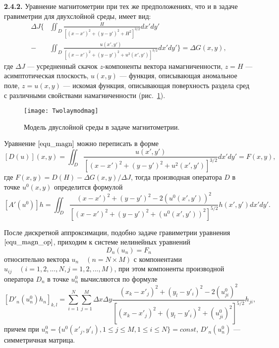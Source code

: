 {\bfseries 2.4.2.} 
Уравнение магнитометрии при тех же предположениях, что и в задаче гравиметрии для двухслойной среды, имеет вид:
\begin{equation}\label{equ_magn}\begin{aligned}
\Delta J  \bigg\{&\iint_{D} \frac{H}{[(x-x')^2+(y-y')^2+H^2]^{3/2}}dx'dy' \\
- &\iint_{D} \frac{u(x',y')}{[(x-x')^2+(y-y')^2+u^2(x',y')]^{3/2}}dx'dy' \bigg\}=\Delta G(x,y),
\end{aligned} \end{equation}
где $\Delta J$ --- усредненный скачок $z$-компоненты вектора намагниченности, $z=H$ --- асимптотическая плоскость, $u(x,y)$ --- функция, описывающая аномальное поле, $z=u(x,y)$ --- искомая функция, описывающая поверхность раздела сред с различными свойствами намагниченности (рис.~\ref{fig:twolayermag}). 
\begin{figure}[h]
	\centering
	\texttt{[image: Twolaymodmag]}
	\caption{Модель двуслойной среды в задаче магнитометрии.}
	\label{fig:twolayermag}
\end{figure}
Уравнение $\eqref{equ_magn}$ можно переписать в форме
\begin{equation}\label{equ_magn_op}
[D(u)](x,y)= \iint_{D} \frac{u(x',y')}{[(x-x')^2+(y-y')^2+u^2(x',y')]^{3/2}}dx'dy'=F(x,y),
\end{equation}
где $F(x,y)=D(H)-\Delta G(x,y)/\Delta J$, тогда производная оператора $D$ в точке $u^0(x,y)$ определится формулой
$$ [A'(u^0)]h=\iint_{D} \frac{(x-x')^2+(y-y')^2-2(u^0(x',y'))^2}{[(x-x')^2+(y-y')^2+(u^0(x',y'))^2]^{5/2}}h(x',y')dx'dy'. $$

После дискретной аппроксимации, подобно задаче гравиметрии уравнения $\eqref{equ_magn_op}$, приходим к системе нелинейных уравнений
\begin{equation}\label{equ_snle_mag}
D_n(u_n)=F_n
\end{equation}
относительно вектора $u_n \quad (n=N\times M)$ с компонентами $u_{ij}\quad (i=1,2,...,N, j=1,2,...,M)$, при этом компоненты производной оператора $D_n$ в точке $u_{n}^{0}$ вычисляются по формуле
\begin{equation}\label{deriv_op_mag}
[D'_n(u_{n}^{0})h_n]_{k,l}=\sum\limits_{i=1}^{N}\sum\limits_{j=1}^{M}
\Delta x\Delta y\frac{(x_k-x'_j)^2+(y_l-y'_i)^2-2(u_{ji}^0)^2}{[(x_k-x'_j)^2+(y_l-y'_i)^2+(u_{ji}^0)^2]^{5/2}}h_{ji}, 
\end{equation}
причем при $u_{n}^{0}=\{u^0(x'_j, y'_i), 1\le j\le M, 1\le i\le N\}=const$, $D'_n(u_n^0)$ --- симметричная матрица.

